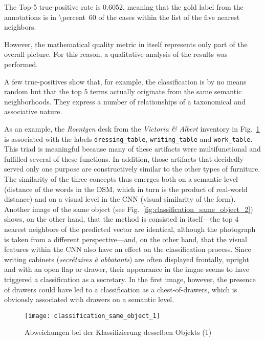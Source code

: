 The Top-5 true-positive rate is \num{0.6052}, meaning that the gold label from the annotations is in \SI{\percent}{60} of the cases within the list of the five nearest neighbors.

However, the mathematical quality metric in itself represents only part of the overall picture. For this reason, a qualitative analysis of the results was performed.

A few true-positives show that, for example, the classification is by no means random but that the top 5 terms actually originate from the same semantic neighborhoods. They express a number of relationships of a taxonomical and associative nature.

As an example, the \emph{Roentgen} desk from the \emph{Victoria \& Albert} inventory in Fig.~\ref{fig:classification_same_object_1} is associated with the labels \texttt{dressing\_table}, \texttt{writing\_table} and \texttt{work\_table}. This triad is meaningful because many of these artifacts were multifunctional and fulfilled several of these functions. In addition, those artifacts that decidedly served only one purpose are constructively similar to the other types of furniture. The similarity of the three concepts thus emerges both on a semantic level (distance of the words in the DSM, which in turn is the product of real-world distance) and on a visual level in the CNN (visual similarity of the form). Another image of the same object (see Fig.~\ref{fig:classification_same_object_2}) shows, on the other hand, that the method is consisted in itself---the top 4 nearest neighbors of the predicted vector are identical, although the photograph is taken from a different perspective---and, on the other hand, that the visual features within the CNN also have an effect on the classification process. Since writing cabinets (\emph{secrétaires à abbatants}) are often displayed frontally, upright and with an open flap or drawer, their appearance in the imgae seems to have triggered a classification as a secretary. In the first image, however, the presence of drawers could have led to a classification as a chest-of-drawers, which is obviously associated with drawers on a semantic level.

\begin{figure}
	\centering
	\texttt{[image: classification\_same\_object\_1]}
	\caption{Abweichungen bei der Klassifizierung desselben Objekts (1)}
	\label{fig:classification_same_object_1}
\end{figure}

